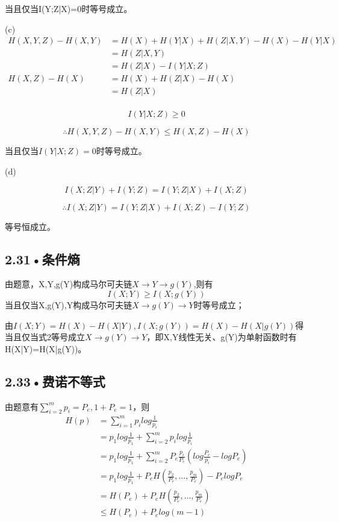 \documentclass[UTF8]{ctexart}
\begin{document}
当且仅当I(Y;Z|X)=0时等号成立。


(c)
\begin{equation*}
\begin{split}
H(X,Y,Z)-H(X,Y)&=H(X)+H(Y|X)+H(Z|X,Y)-H(X)-H(Y|X)\\
&=H(Z|X,Y)\\
&=H(Z|X)-I(Y|X;Z)\\
H(X,Z)-H(X)&=H(X)+H(Z|X)-H(X)\\
&=H(Z|X)\\
\end{split}
\end{equation*}

$$I(Y|X;Z) \geqslant 0$$

$$\therefore H(X,Y,Z)-H(X,Y)\leqslant H(X,Z)-H(X)$$

当且仅当$I(Y|X;Z)=0$时等号成立。

(d)

$$I(X;Z|Y)+I(Y;Z)=I(Y;Z|X)+I(X;Z)$$

$$\therefore I(X;Z|Y)=I(Y;Z|X)+I(X;Z)-I(Y;Z)$$

等号恒成立。


\subsection*{2.31•条件熵}

由题意，X,Y,g(Y)构成马尔可夫链$X\rightarrow Y\rightarrow g(Y)$,则有
\begin{equation}
I(X;Y)\geqslant I(X;g(Y))
\end{equation}
当且仅当X,g(Y),Y构成马尔可夫链$X\rightarrow g(Y)\rightarrow Y$时等号成立；

由$I(X;Y)=H(X)-H(X|Y), I(X;g(Y))= H(X)-H(X|g(Y))$得当且仅当式2等号成立$X\rightarrow g(Y)\rightarrow Y$，即X,Y线性无关、g(Y)为单射函数时有H(X|Y)=H(X|g(Y))。

\subsection*{2.33•费诺不等式}

由题意有$\sum_{i=2}^m p_i=P_e, 1+P_e=1$，则
\begin{equation*}
\begin{split}
H(p)&= \sum _{i=1}^m p_ilog\frac{1}{p_i}\\
&=p_1log\frac{1}{p_1}+\sum_{i=2}^m p_ilog\frac{1}{p_i}\\
&=p_1log\frac{1}{p_1}+\sum_{i=2}^m P_e\frac{p_i}{P_e} (log\frac{P_e}{p_i}-logP_e)\\
&=p_1log\frac{1}{p_1} + P_eH(\frac{p_2}{P_e},\dots ,\frac{p_m}{P_e})-P_elogP_e\\
&=H(P_e)+ P_eH(\frac{p_2}{P_e},\dots ,\frac{p_m}{P_e})\\
&\leqslant H(P_e)+ P_elog(m-1)\\
\end{split}
\end{equation*}
\end{document}
